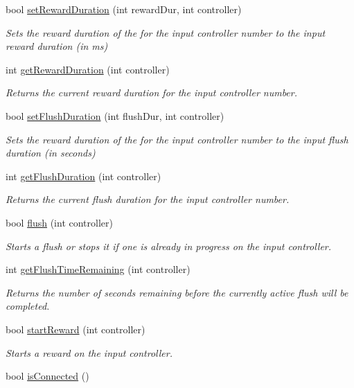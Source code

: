 \begin{DoxyCompactItemize}
bool \hyperlink{class_director_interface_a67f9e1237b43292deb6d287f10d15bff}{set\-Reward\-Duration} (int reward\-Dur, int controller)
\begin{DoxyCompactList}\small\item\em Sets the reward duration of the for the input controller number to the input reward duration (in ms) \end{DoxyCompactList}\item 
int \hyperlink{class_director_interface_a610f12491884aebd3b775b5fbbb3202c}{get\-Reward\-Duration} (int controller)
\begin{DoxyCompactList}\small\item\em Returns the current reward duration for the input controller number. \end{DoxyCompactList}\item 
bool \hyperlink{class_director_interface_ac38c9e1b84eaddc5210ecb347db5df32}{set\-Flush\-Duration} (int flush\-Dur, int controller)
\begin{DoxyCompactList}\small\item\em Sets the reward duration of the for the input controller number to the input flush duration (in seconds) \end{DoxyCompactList}\item 
int \hyperlink{class_director_interface_a38dfc7b5d091c8ba5df16f608376f3b7}{get\-Flush\-Duration} (int controller)
\begin{DoxyCompactList}\small\item\em Returns the current flush duration for the input controller number. \end{DoxyCompactList}\item 
bool \hyperlink{class_director_interface_a9ded2d133f5911f909ac3e4a0029dd68}{flush} (int controller)
\begin{DoxyCompactList}\small\item\em Starts a flush or stops it if one is already in progress on the input controller. \end{DoxyCompactList}\item 
int \hyperlink{class_director_interface_affd5f08e8c7f6a77b76e8776fd16f223}{get\-Flush\-Time\-Remaining} (int controller)
\begin{DoxyCompactList}\small\item\em Returns the number of seconds remaining before the currently active flush will be completed. \end{DoxyCompactList}\item 
bool \hyperlink{class_director_interface_a82b07bf6375ff90d71663a0373a86765}{start\-Reward} (int controller)
\begin{DoxyCompactList}\small\item\em Starts a reward on the input controller. \end{DoxyCompactList}\item 
\hypertarget{class_director_interface_a66be82803781f998f822e1e151e2fb4a}{bool \hyperlink{class_director_interface_a66be82803781f998f822e1e151e2fb4a}{is\-Connected} ()}\label{class_director_interface_a66be82803781f998f822e1e151e2fb4a}


\end{DoxyCompactItemize}
